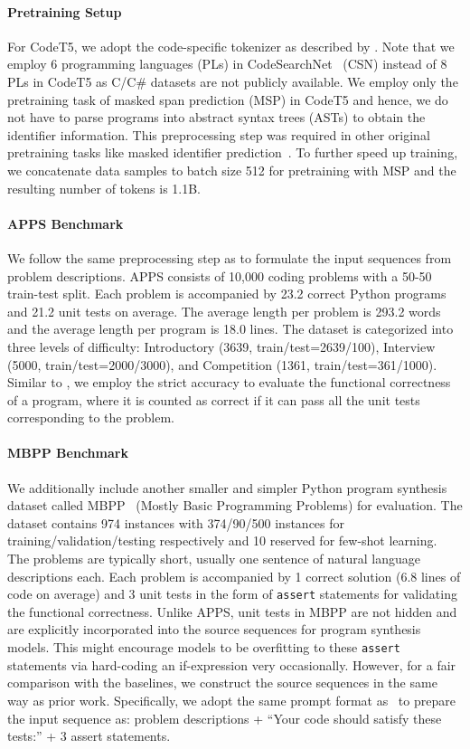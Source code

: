 \documentclass{article}
\begin{document}
\paragraph{Pretraining Setup}
For CodeT5, we adopt the code-specific tokenizer as described by \citet{codet5}.
Note that we employ 6 programming languages (PLs) in CodeSearchNet~\citep{csn} (CSN) instead of 8 PLs in CodeT5 as C/C\# datasets are not publicly available. 
We employ only the pretraining task of masked span prediction (MSP) in CodeT5 and hence, we do not have to parse programs into abstract syntax trees (ASTs) to obtain the identifier information.
This preprocessing step was required in other original pretraining tasks like masked identifier prediction~\citep{codet5}.
To further speed up training, we concatenate data samples to batch size 512 for pretraining with MSP and the resulting number of tokens is 1.1B.

\paragraph{APPS Benchmark}
We follow the same preprocessing step as \citet{hendrycksapps2021} to formulate the input sequences from problem descriptions.
APPS consists of 10,000 coding problems with a 50-50 train-test split. Each problem is accompanied by 23.2 correct Python programs and 21.2 unit tests on average. The average length per problem is 293.2 words and the average length per program is 18.0 lines. The dataset is categorized into three levels of difficulty: Introductory (3639, train/test=2639/100), Interview (5000, train/test=2000/3000), and Competition (1361, train/test=361/1000). 
Similar to \citep{hendrycksapps2021}, 
we employ the strict accuracy to evaluate the functional correctness of a program, where it is counted as correct if it can pass all the unit tests corresponding to the problem. 

\paragraph{MBPP Benchmark}
We additionally include another smaller and simpler Python program synthesis dataset called MBPP~\citep{austin2021program} (Mostly Basic Programming Problems) for evaluation. The dataset contains 974 instances with 374/90/500 instances for training/validation/testing respectively and 10 reserved for few-shot learning. 
The problems are typically short, usually one sentence of natural language descriptions each.
Each problem is accompanied by 1 correct solution (6.8 lines of code on average) and 3 unit tests in the form of \texttt{assert} statements for validating the functional correctness. Unlike APPS, unit tests in MBPP are not hidden and are explicitly incorporated into the source sequences for program synthesis models. 
This might encourage models to be overfitting to these \texttt{assert} statements via hard-coding an if-expression very occasionally.
However, for a fair comparison with the baselines, we construct the source sequences in the same way as prior work. Specifically, we adopt the same prompt format as~\citet{austin2021program} to prepare the input sequence as: problem descriptions + ``Your code should satisfy these tests:'' + 3 assert statements.
\end{document}
